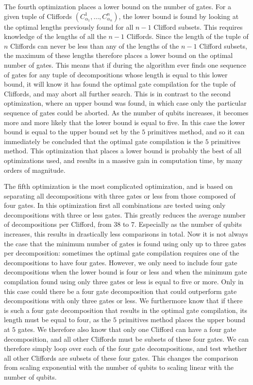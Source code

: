     The fourth optimization places a lower bound on the number of gates. For a given tuple of Cliffords $\left(C_{\alpha_1}^1, \dots, C_{\alpha_n}^n\right)$, the lower bound is found by looking at the optimal lengths previously found for all $n-1$ Clifford subsets. This requires knowledge of the lengths of all the $n-1$ Cliffords. Since the length of the tuple of $n$ Cliffords can never be less than any of the lengths of the $n-1$ Clifford subsets, the maximum of these lengths therefore places a lower bound on the optimal number of gates. This means that if during the algorithm ever finds one sequence of gates for any tuple of decompositions whose length is equal to this lower bound, it will know it has found the optimal gate compilation for the tuple of Cliffords, and may abort all further search. This is in contrast to the second optimization, where an upper bound was found, in which case only the particular sequence of gates could be aborted. As the number of qubits increases, it becomes more and more likely that the lower bound is equal to five. In this case the lower bound is equal to the upper bound set by the $5$ primitives method, and so it can immediately be concluded that the optimal gate compilation is the $5$ primitives method. This optimization that places a lower bound is probably the best of all optimizations used, and results in a massive gain in computation time, by many orders of magnitude.

    The fifth optimization is the most complicated optimization, and is based on separating all decompositions with three gates or less from those composed of four gates. In this optimization first all combinations are tested using only decompositions with three or less gates. This greatly reduces the average number of decompositions per Clifford, from $38$ to $7$. Especially as the number of qubits increases, this results in drastically less comparisons in total. Now it is not always the case that the minimum number of gates is found using only up to three gates per decomposition: sometimes the optimal gate compilation requires one of the decompositions to have four gates. However, we only need to include four gate decompositions when the lower bound is four or less and when the minimum gate compilation found using only three gates or less is equal to five or more. Only in this case could there be a four gate decomposition that could outperform gate decompositions with only three gates or less. We furthermore know that if there is such a four gate decomposition that results in the optimal gate compilation, its length must be equal to four, as the $5$ primitives method places the upper bound at $5$ gates. We therefore also know that only one Clifford can have a four gate decomposition, and all other Cliffords must be subsets of these four gates. We can therefore simply loop over each of the four gate decompositions, and test whether all other Cliffords are subsets of these four gates. This changes the comparison from scaling exponential with the number of qubits to scaling linear with the number of qubits.

